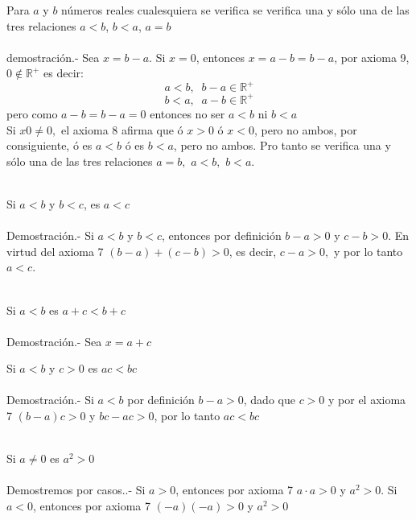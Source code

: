 \begin{teo}
Para $a$ y $b$ números reales cualesquiera se verifica se verifica una y sólo una de las tres relaciones $a<b$, $b<a$, $a=b$\\\\
demostración.- \;
Sea $x=b-a$. Si $x=0$, entonces $x=a-b=b-a$, por axioma 9, $0\notin \mathbb{R}^+$ es decir:
$$a<b, \; \; b-a \in \mathbb{R}^+$$
$$b<a, \; \;  a-b \in \mathbb{R}^+$$
pero como $a-b=b-a=0$ entonces no ser $a<b$ ni $b<a$\\
Si $x0\neq 0,$ el axioma 8 afirma que ó $x>0$ ó $ x<0$, pero no ambos, por consiguiente, ó es $a<b$ ó es $b<a$, pero no ambos. Pro tanto se verifica una y sólo una de las tres relaciones $a=b,$ $a<b,$ $b<a$.\\\\
\end{teo}

\begin{teo}
Si $a<b$ y $b<c$, es $a<c$\\\\
Demostración.- \;
Si $a<b$ y $b<c$, entonces por definición $b-a>0$ y $c-b>0$. En virtud del axioma 7 $(b-a)+(c-b)>0$, es decir, $c-a>0,$ y por lo tanto $a<c$.\\\\
\end{teo}

\begin{teo}
Si $a<b$ es $a+c<b+c$\\\\
Demostración.- \;
Sea $x=a+c$
\end{teo}

\begin{teo}
Si $a<b$ y $c>0$ es $ac<bc$\\\\
Demostración.- \;
Si $a<b$ por definición $b-a>0$, dado que  $c>0$ y por el axioma 7 $(b-a)c>0$ y $bc-ac>0$, por lo tanto $ac<bc$\\\\
\end{teo}

\begin{teo}
Si $a\neq0$ es $a^2>0$\\\\
Demostremos por casos..- \;
Si $a>0$, entonces por axioma 7  \; $a\cdot a >0$ \; y \; $a^2>0$. Si $a<0$, entonces por axioma 7  \; $(-a)(-a)>0$ \; y  \; $a^2>0$\\\\
\end{teo}

